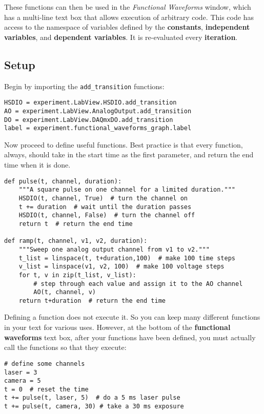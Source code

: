 \documentclass[pdftex,11pt,letterpaper]{article}
\begin{document}
These functions can then be used in the \textit{Functional Waveforms} window, which has a multi-line text box that allows execution of arbitrary code.  This code has access to the namespace of variables defined by the \textbf{constants}, \textbf{independent variables}, and \textbf{dependent variables}.  It is re-evaluated every \textbf{iteration}.

\subsection{Setup}

Begin by importing the \texttt{add\_transition} functions:

\begin{verbatim}
HSDIO = experiment.LabView.HSDIO.add_transition
AO = experiment.LabView.AnalogOutput.add_transition
DO = experiment.LabView.DAQmxDO.add_transition
label = experiment.functional_waveforms_graph.label
\end{verbatim}

Now proceed to define useful functions.  Best practice is that every function, always, should take in the start time as the first parameter, and return the end time when it is done.

\begin{verbatim}
def pulse(t, channel, duration):
    """A square pulse on one channel for a limited duration."""
    HSDIO(t, channel, True)  # turn the channel on
    t += duration  # wait until the duration passes
    HSDIO(t, channel, False)  # turn the channel off
    return t  # return the end time

def ramp(t, channel, v1, v2, duration):
    """Sweep one analog output channel from v1 to v2."""
    t_list = linspace(t, t+duration,100)  # make 100 time steps
    v_list = linspace(v1, v2, 100)  # make 100 voltage steps
    for t, v in zip(t_list, v_list):
        # step through each value and assign it to the AO channel
        AO(t, channel, v)
    return t+duration  # return the end time
\end{verbatim}

Defining a function does not execute it.  So you can keep many different functions in your text for various uses.  However, at the bottom of the \textbf{functional waveforms} text box, after your functions have been defined, you must actually call the functions so that they execute:

\begin{verbatim}
# define some channels
laser = 3
camera = 5
t = 0  # reset the time
t += pulse(t, laser, 5)  # do a 5 ms laser pulse
t += pulse(t, camera, 30) # take a 30 ms exposure
\end{verbatim}
\end{document}
